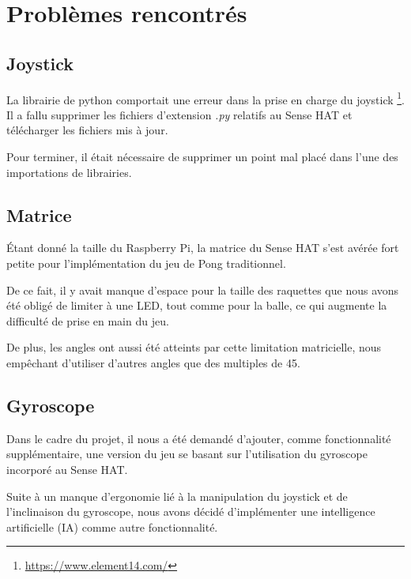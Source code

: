 \section{Problèmes rencontrés}
\label{sec:probl-renc}

\subsection{Joystick}
\label{sec:joystick}

La librairie de python comportait une erreur dans la prise en charge du joystick
\footnote{\href{https://www.element14.com/community/community/raspberry-pi/raspberry-pi-accessories/blog/2017/01/23/raspberry-pi-sense-hat-enabling-the-joystick}{https://www.element14.com/}}. Il
a fallu supprimer les fichiers d'extension \og \textit{.py} \fg relatifs au
Sense HAT et télécharger les fichiers mis à jour.

Pour terminer, il était nécessaire de supprimer un point mal placé dans l'une des
importations de librairies.

\subsection{Matrice}
\label{sec:matrice}

Étant donné la taille du Raspberry Pi, la matrice du Sense HAT s'est avérée fort petite
pour l'implémentation du jeu de Pong traditionnel.

De ce fait, il y avait manque d'espace pour la taille des raquettes que nous
avons été obligé de limiter à une LED, tout comme pour la balle, ce qui augmente
la difficulté de prise en main du jeu.

De plus, les angles ont aussi été atteints par cette limitation matricielle, nous
empêchant d'utiliser d'autres angles que des multiples de 45.

\subsection{Gyroscope}
\label{sec:gyroscope}

Dans le cadre du projet, il nous a été demandé d'ajouter, comme fonctionnalité
supplémentaire, une version du jeu se basant sur l'utilisation du gyroscope
incorporé au Sense HAT.

Suite à un manque d'ergonomie lié à la manipulation du joystick et de
l'inclinaison du gyroscope, nous avons décidé d'implémenter une intelligence
artificielle (IA) comme autre fonctionnalité.

